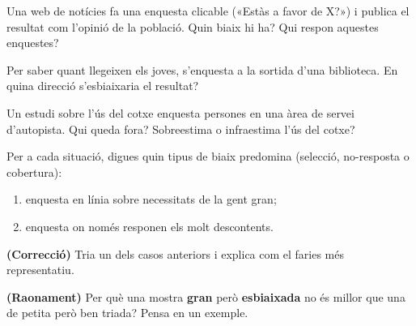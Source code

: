 \begin{exercicis}
\begin{exlist}
  \item Una web de notícies fa una enquesta clicable («Estàs a favor de X?») i publica el
        resultat com l'opinió de la població. Quin biaix hi ha? Qui respon aquestes
        enquestes?
  \item Per saber quant llegeixen els joves, s'enquesta a la sortida d'una biblioteca. En
        quina direcció s'esbiaixaria el resultat?
  \item Un estudi sobre l'ús del cotxe enquesta persones en una àrea de servei d'autopista.
        Qui queda fora? Sobreestima o infraestima l'ús del cotxe?
  \item Per a cada situació, digues quin tipus de biaix predomina (selecció, no-resposta o
        cobertura):
        \begin{enumerate}[label=\alph*), leftmargin=1.6em, topsep=2pt]
          \item enquesta en línia sobre necessitats de la gent gran;
          \item enquesta on només responen els molt descontents.
        \end{enumerate}
  \item \textbf{(Correcció)} Tria un dels casos anteriors i explica com el faries més
        representatiu.
  \item \textbf{(Raonament)} Per què una mostra \textbf{gran} però \textbf{esbiaixada} no
        és millor que una de petita però ben triada? Pensa en un exemple.
\end{exlist}
\end{exercicis}


